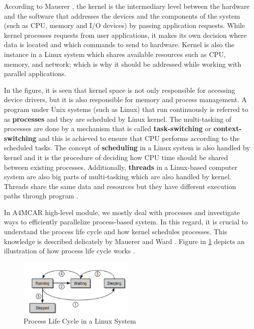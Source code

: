According to Mauerer \cite{linuxkernelbook}, the kernel is the intermediary level between the hardware and the software that addresses the devices and the components of the system (such as CPU, memory and I/O devices) by passing application requests. While kernel processes requests from user applications, it makes its own decision where data is located and which commands to send to hardware. Kernel is also the instance in a Linux system which shares available resources such as CPU, memory, and network; which is why it should be addressed while working with parallel applications.

In the figure, it is seen that kernel space is not only responsible for accessing device drivers, but it is also responsible for memory and process management. A program under Unix systems (such as Linux) that run continuously is referred to as \textbf{processes} and they are scheduled by Linux kernel. The multi-tasking of processes are done by a mechanism that is called \textbf{task-switching} or \textbf{context-switching} and this is achieved to ensure that CPU performs according to the scheduled tasks. The concept of \textbf{scheduling} in a Linux system is also handled by kernel and it is the procedure of deciding how CPU time should be shared between existing processes. Additionally, \textbf{threads} in a Linux-based computer system are also big parts of multi-tasking which are also handled by kernel. Threads share the same data and resources but they have different execution paths through program \cite{linuxkernelbook}.

In A4MCAR high-level module, we mostly deal with processes and investigate ways to efficiently parallelize process-based system. In this regard, it is crucial to understand the process life cycle and how kernel schedules processes. This knowledge is described delicately by Mauerer \cite{linuxkernelbook} and Ward \cite{howlinuxworksbook}. Figure in \ref{fig:processlifecycle} depicts an illustration of how process life cycle works \cite{linuxkernelbook}.
\begin{figure}[!ht]
	\centering
	\includegraphics[width=0.5\textwidth]{content/images/processlifecycle.png}
	\caption{Process Life Cycle in a Linux System \cite{linuxkernelbook}}
	\label{fig:processlifecycle}
\end{figure}

